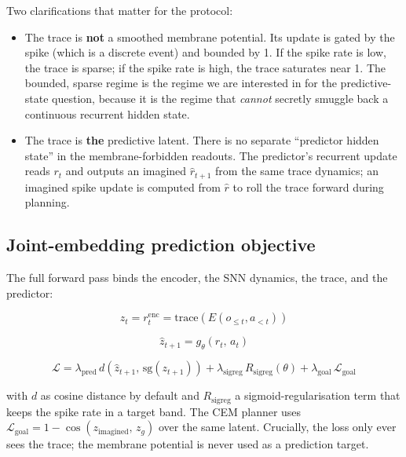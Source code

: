 \documentclass{article}
\begin{document}
Two clarifications that matter for the protocol:

\begin{itemize}
\item The trace is \textbf{not} a smoothed membrane potential. Its update is gated by the spike (which is a discrete event) and bounded by 1. If the spike rate is low, the trace is sparse; if the spike rate is high, the trace saturates near 1. The bounded, sparse regime is the regime we are interested in for the predictive-state question, because it is the regime that \emph{cannot} secretly smuggle back a continuous recurrent hidden state.
\item The trace is \textbf{the} predictive latent. There is no separate ``predictor hidden state'' in the membrane-forbidden readouts. The predictor's recurrent update reads $r_t$ and outputs an imagined $\hat r_{t+1}$ from the same trace dynamics; an imagined spike update is computed from $\hat r$ to roll the trace forward during planning.
\end{itemize}

\subsection{Joint-embedding prediction objective}

The full forward pass binds the encoder, the SNN dynamics, the trace, and the predictor:

\begin{equation}
z_t = r_t^{\mathrm{enc}} = \mathrm{trace}(E(o_{\leq t}, a_{<t}))
\end{equation}

\begin{equation}
\hat{z}_{t+1} = g_\theta(r_t,\, a_t)
\end{equation}

\begin{equation}
\mathcal{L} = \lambda_{\mathrm{pred}} \, d\!\left(\hat{z}_{t+1},\, \mathrm{sg}(z_{t+1})\right) + \lambda_{\mathrm{sigreg}} \, R_{\mathrm{sigreg}}(\theta) + \lambda_{\mathrm{goal}} \, \mathcal{L}_{\mathrm{goal}}
\end{equation}

with $d$ as cosine distance by default and $R_{\mathrm{sigreg}}$ a sigmoid-regularisation term that keeps the spike rate in a target band. The CEM planner uses $\mathcal{L}_{\mathrm{goal}} = 1 - \cos(z_{\mathrm{imagined}},\, z_g)$ over the same latent. Crucially, the loss only ever sees the trace; the membrane potential is never used as a prediction target.
\end{document}
